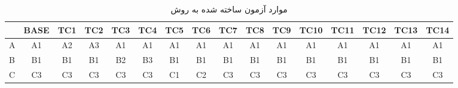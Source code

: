 \documentclass[twoside]{article}
\newenvironment{answer}{}{\medskip}
\begin{document}
\begin{answer}
	\begin{table}[h]
		\centering
		\caption{موارد آزمون ساخته شده به روش }
		\label{tbl:bcc-test-cases}
		\begin{latin}
		\begin{tabular}{l|c|c|c|c|c|c|c|c|c|c|c|c|c|c|c|}
\cline{2-16}
                        & \multicolumn{1}{l|}{\textbf{BASE}} & \multicolumn{1}{l|}{\textbf{TC1}} & \multicolumn{1}{l|}{\textbf{TC2}} & \multicolumn{1}{l|}{\textbf{TC3}} & \multicolumn{1}{l|}{\textbf{TC4}} & \multicolumn{1}{l|}{\textbf{TC5}} & \multicolumn{1}{l|}{\textbf{TC6}} & \multicolumn{1}{l|}{\textbf{TC7}} & \multicolumn{1}{l|}{\textbf{TC8}} & \multicolumn{1}{l|}{\textbf{TC9}} & \multicolumn{1}{l|}{\textbf{TC10}} & \multicolumn{1}{l|}{\textbf{TC11}} & \multicolumn{1}{l|}{\textbf{TC12}} & \multicolumn{1}{l|}{\textbf{TC13}} & \multicolumn{1}{l|}{\textbf{TC14}} \\ \hline
\multicolumn{1}{|l|}{A} & A1                                 & A2                                & A3                                & A1                                & A1                                & A1                                & A1                                & A1                                & A1                                & A1                                & A1                                 & A1                                 & A1                                 & A1                                 & A1                                 \\ \hline
\multicolumn{1}{|l|}{B} & B1                                 & B1                                & B1                                & B2                                & B3                                & B1                                & B1                                & B1                                & B1                                & B1                                & B1                                 & B1                                 & B1                                 & B1                                 & B1                                 \\ \hline
\multicolumn{1}{|l|}{C} & C3                                 & C3                                & C3                                & C3                                & C3                                & C1                                & C2                                & C3                                & C3                                & C3                                & C3                                 & C3                                 & C3                                 & C3                                 & C3                                 \\ \hline

\end{tabular}
\end{latin}
\end{table}
\end{answer}
\end{document}
